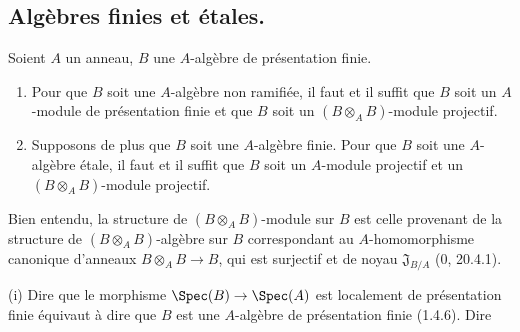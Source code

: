 \subsection{Algèbres finies et étales.}

\begin{proposition}[18.3.1]
\label{IV.18.3.1}
Soient $A$ un anneau, $B$ une $A$-algèbre de présentation finie.
\begin{enumerate}
  \item[(i)] Pour que $B$ soit une $A$-algèbre non ramifiée, il faut et il suffit que $B$ soit un $A$-module de présentation finie et que $B$ soit un $(B\otimes_A B)$-module projectif.
  \item[(ii)] Supposons de plus que $B$ soit une $A$-algèbre finie. Pour que $B$ soit une $A$-algèbre étale, il faut et il suffit que $B$ soit un $A$-module projectif et un $(B\otimes_A B)$-module projectif.
\end{enumerate}
\end{proposition}

Bien entendu, la structure de $(B\otimes_A B)$-module sur $B$ est celle provenant de la structure de $(B\otimes_A B)$-algèbre sur $B$ correspondant au $A$-homomorphisme canonique d'anneaux $B\otimes_A B\to B$, qui est surjectif et de noyau $\mathfrak J_{B/A}$ (0, 20.4.1).

(i) Dire que le morphisme $\Spec(B)\to\Spec(A)$ est localement de présentation finie équivaut à dire que $B$ est une $A$-algèbre de présentation finie (1.4.6). Dire

